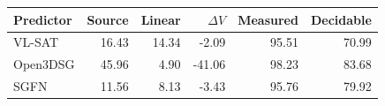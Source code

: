 \begin{tabular}{lrrrrr}
\toprule
Predictor & Source & Linear & $\Delta V$ & Measured & Decidable \\
\midrule
VL-SAT & 16.43 & 14.34 & -2.09 & 95.51 & 70.99 \\
Open3DSG & 45.96 & 4.90 & -41.06 & 98.23 & 83.68 \\
SGFN & 11.56 & 8.13 & -3.43 & 95.76 & 79.92 \\
\bottomrule
\end{tabular}
